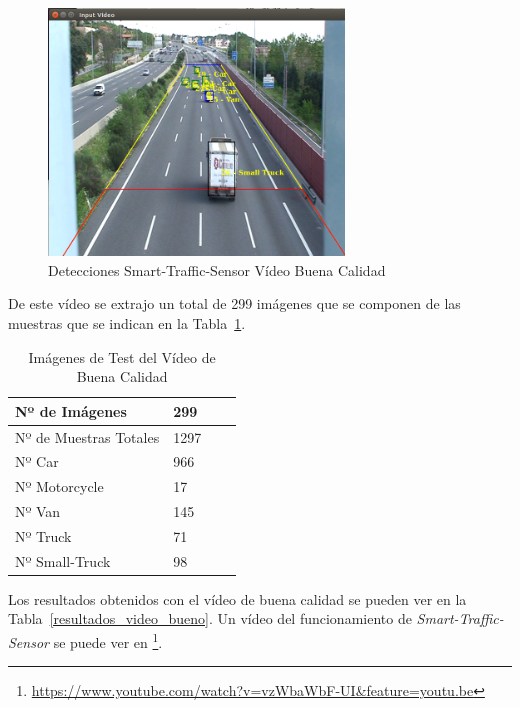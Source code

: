 \begin{figure}[H] 
\begin{center}
	\includegraphics[width=0.7\textwidth]{figures/Experimentos/sts_buena.png}
   \caption{Detecciones Smart-Traffic-Sensor Vídeo Buena Calidad}
	\label{fig.video_buena_calidad}
\end{center}
\end{figure}

De este vídeo se extrajo un total de 299 imágenes que se componen de las muestras que se indican en la Tabla~\ref{tabla_video_bueno}.

\begin{table}[H] 
\begin{center}
\begin{tabular}{|l|l|l|l|}
\hline
Nº de Imágenes  & 299 \\
\hline \hline
Nº de Muestras Totales & 1297\\ \hline
Nº Car & 966 \\ \hline
Nº Motorcycle & 17 \\ \hline
Nº Van & 145 \\ \hline
Nº Truck & 71 \\ \hline
Nº Small-Truck & 98 \\ \hline
\end{tabular}
\caption{Imágenes de Test del Vídeo de Buena Calidad}
\label{tabla_video_bueno}
\end{center}
\end{table}

Los resultados obtenidos con el vídeo de buena calidad se pueden ver en la Tabla~\ref{resultados_video_bueno}. Un vídeo del funcionamiento de \textit{Smart-Traffic-Sensor} se puede ver en \footnote{\url{https://www.youtube.com/watch?v=vzWbaWbF-UI&feature=youtu.be}}.

